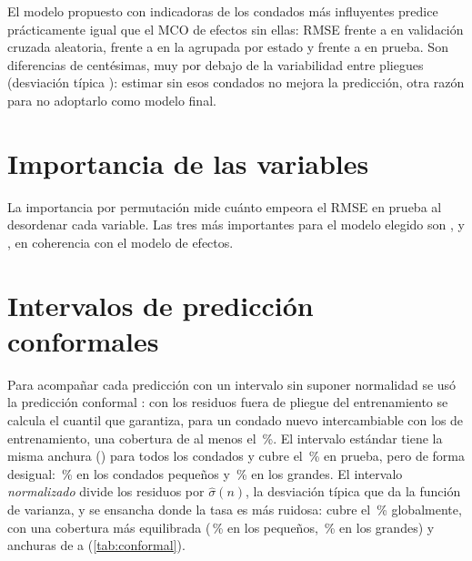 El modelo propuesto con indicadoras de los  condados más influyentes predice
prácticamente igual que el MCO de efectos sin ellas: RMSE  frente a
 en validación cruzada aleatoria,  frente a
 en la agrupada por estado y  frente a
 en prueba. Son diferencias de centésimas, muy por debajo de la
variabilidad entre pliegues (desviación típica ): estimar sin esos
condados no mejora la predicción, otra razón para no adoptarlo como modelo final.

\section{Importancia de las variables}

La importancia por permutación mide cuánto empeora el RMSE en prueba al desordenar cada variable.
Las tres más importantes para el modelo elegido son ,  y
, en coherencia con el modelo de efectos.


\section{Intervalos de predicción conformales}

Para acompañar cada predicción con un intervalo sin suponer normalidad se usó la predicción
conformal \parencite{lei2018}: con los residuos fuera de pliegue del entrenamiento se calcula el
cuantil que garantiza, para un condado nuevo intercambiable con los de entrenamiento, una cobertura
de al menos el \,\%. El intervalo estándar tiene la misma anchura
() para todos los condados y cubre el \,\% en prueba, pero de
forma desigual: \,\% en los condados pequeños y \,\% en los
grandes. El intervalo \emph{normalizado} divide los residuos por $\hat\sigma(n)$, la desviación
típica que da la función de varianza, y se ensancha donde la tasa es más ruidosa: cubre el
\,\% globalmente, con una cobertura más equilibrada (\,\% en los
pequeños, \,\% en los grandes) y anchuras de  a
 (\cref{tab:conformal}).


